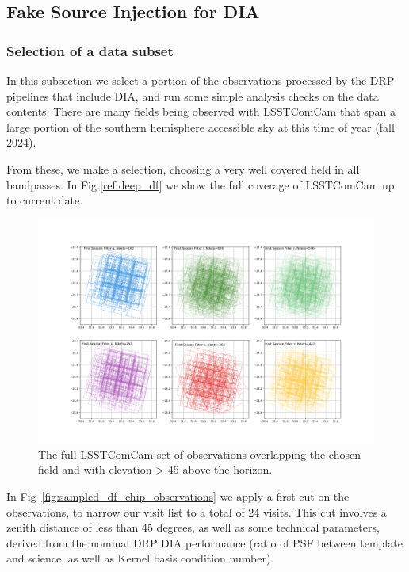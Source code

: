 \subsection{Fake Source Injection for DIA}
\subsubsection{Selection of a data subset}

In this subsection we select a portion of the observations processed by the DRP pipelines that include DIA, and run some simple analysis checks on the data contents. There are many fields being observed with LSSTComCam that span a large portion of the southern hemisphere accessible sky at this time of year (fall 2024).

From these, we make a selection, choosing a very well covered field in all bandpasses. In Fig.\ref{ref:deep_df} we show the full coverage of LSSTComCam up to current date.

\begin{figure}
    \centering
    \includegraphics[width=0.95\linewidth]{figures/deep_df_chip_observations.png}
    \caption{The full LSSTComCam set of observations overlapping the chosen field and with elevation > 45 above the horizon.}
    \label{fig:deep_df}
    
\end{figure}

In Fig~\ref{fig:sampled_df_chip_observations} we apply a first cut on the observations, to narrow our visit list to a total of 24 visits. This cut involves a zenith distance of less than 45 degrees, as well as some technical parameters, derived from the nominal DRP DIA performance (ratio of PSF between template and science, as well as Kernel basis condition number). 

